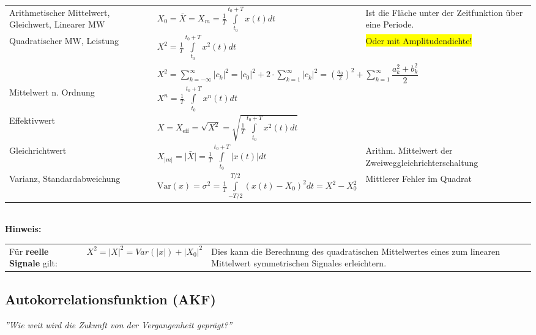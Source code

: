 		\begin{tabularx}{\textwidth}{p{4.7cm}p{8.1cm}X}
			Arithmetischer Mittelwert, Gleichwert, Linearer MW
		&	$X_0 = \overline{X} = X_m = \frac {1} {T} \int\limits_{t_0}^{t_0+T} x(t)dt$
		&	Ist die Fläche unter der Zeitfunktion über eine Periode.
		\\
			Quadratischer MW, Leistung
		&	$X^2 = \frac {1} {T} \int\limits_{t_0}^{t_0+T} x^2(t)dt$
		& 	\colorbox{yellow}{Oder mit Amplitudendichte!}
		\\
			{}
		&	\multicolumn{2}{l}{$X^2	= \sum\limits_{k=-\infty}^{\infty} |c_k|^2 
									= |c_0|^2 + 2 \cdot \sum\limits_{k=1}^{\infty} |c_k|^2
									= \left( \frac{a_0}{2} \right)^2 + \sum\limits_{k=1}^{\infty} \dfrac{a_k^2 + b_k^2}{2}$}
		\\
			Mittelwert n. Ordnung
		&	$X^n = \frac {1} {T} \int\limits_{t_0}^{t_0+T} x^n(t)dt$
		& 	{}
		\\
			Effektivwert
		&	$X = X_{\text{eff}}= \sqrt{X^2} = \sqrt{\frac{1}{T} \int\limits ^{t_0+T} _{t_0}{x^2(t)dt}}$
		&	{} 
		\\
			Gleichrichtwert
		&	$X_{|m|} = \bar{|X|} = \frac{1}{T} \int\limits_{t_0}^{t_0+T}{|x(t)| dt}$
		&	Arithm. Mittelwert der Zweiweggleichrichterschaltung
	    \\
			Varianz, Standardabweichung
		&	$\text{Var}(x)=\sigma^2= \frac {1} {T} \int\limits_{-T/2}^{T/2}(x(t)-X_0)^2dt = X^2-X_0^2$
		&	Mittlerer Fehler im Quadrat
		\\
		\end{tabularx} \\
	
		\textbf{Hinweis:} \\
		\begin{tabularx}{\textwidth}{llX}
			Für \textbf{reelle Signale} gilt: &
			$ X^2 = |X|^2 = Var(|x|) + |X_0|^2 $ &
			Dies kann die Berechnung des quadratischen Mittelwertes eines zum linearen Mittelwert symmetrischen Signales erleichtern.
		\end{tabularx}
		
		
	\subsection{Autokorrelationsfunktion (AKF) } 
		\textit{''Wie weit wird die Zukunft von der Vergangenheit geprägt?''} \\
		
